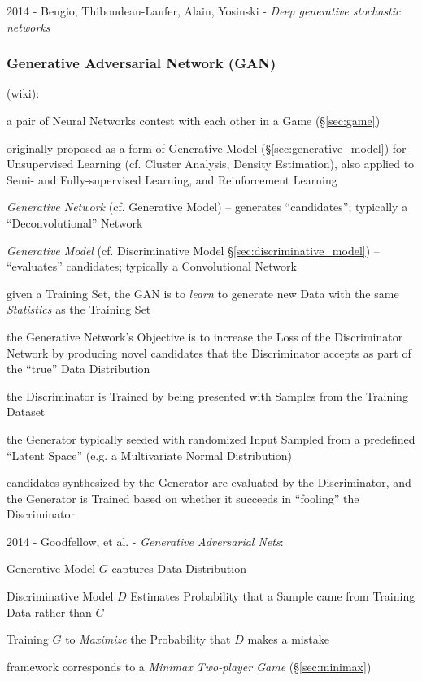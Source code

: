 2014 - Bengio, Thiboudeau-Laufer, Alain, Yosinski -
\emph{Deep generative stochastic networks}



\subsubsection{Generative Adversarial Network (GAN)}\label{sec:gan}

(wiki):

a pair of Neural Networks contest with each other in a Game (\S\ref{sec:game})

originally proposed as a form of Generative Model
(\S\ref{sec:generative_model}) for Unsupervised Learning (cf. Cluster Analysis,
Density Estimation),
also applied to Semi- and Fully-supervised Learning, and Reinforcement Learning

\emph{Generative Network} (cf. Generative Model) -- generates ``candidates'';
typically a ``Deconvolutional'' Network

\emph{Generative Model} (cf. Discriminative Model
\S\ref{sec:discriminative_model}) -- ``evaluates'' candidates; typically a
Convolutional Network

given a Training Set, the GAN is to \emph{learn} to generate new Data with the
same \emph{Statistics} as the Training Set

the Generative Network's Objective is to increase the Loss of the Discriminator
Network by producing novel candidates that the Discriminator accepts as part of
the ``true'' Data Distribution

the Discriminator is Trained by being presented with Samples from the Training
Dataset

the Generator typically seeded with randomized Input Sampled from a predefined
``Latent Space'' (e.g. a Multivariate Normal Distribution)

candidates synthesized by the Generator are evaluated by the Discriminator, and
the Generator is Trained based on whether it succeeds in ``fooling'' the
Discriminator

2014 - Goodfellow, et al. - \emph{Generative Adversarial Nets}:

Generative Model $G$ captures Data Distribution

Discriminative Model $D$ Estimates Probability that a Sample came from Training
Data rather than $G$

Training $G$ to \emph{Maximize} the Probability that $D$ makes a mistake

framework corresponds to a \emph{Minimax Two-player Game} (\S\ref{sec:minimax})

